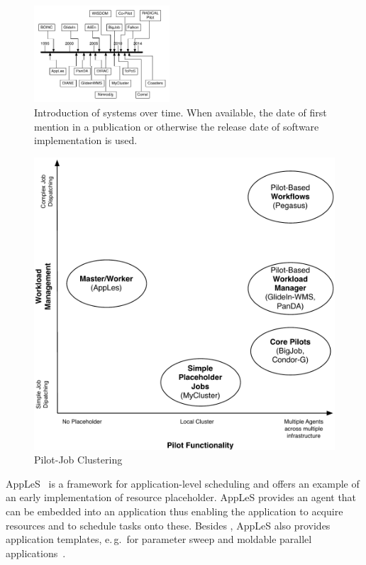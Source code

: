 \documentclass{sig-alternate}
\begin{document}

\begin{figure}[t]
  \centering
    \includegraphics[width=0.45\textwidth]{figures/timeline}
    \caption{Introduction of systems over time. When available, the date of
      first mention in a publication or otherwise the release date of software
      implementation is used. }
    \label{fig:timeline}
\end{figure}

\begin{figure}[t]
  \centering
    \includegraphics[width=.45\textwidth]{figures/pilotjob-clustering.pdf}
  \caption{Pilot-Job Clustering}
  \label{fig:pilotjob_clustering}
\end{figure}

AppLeS~\cite{Berman:1996:apples} is a framework for application-level scheduling
and offers an example of an early implementation of resource placeholder. AppLeS
provides an agent that can be embedded into an application thus enabling the
application to acquire resources and to schedule tasks onto these. Besides \MW,
AppLeS also provides application templates, e.\,g.\ for parameter sweep and
moldable parallel applications~\cite{Berman:2003:ACG:766629.766632}.
\end{document}

